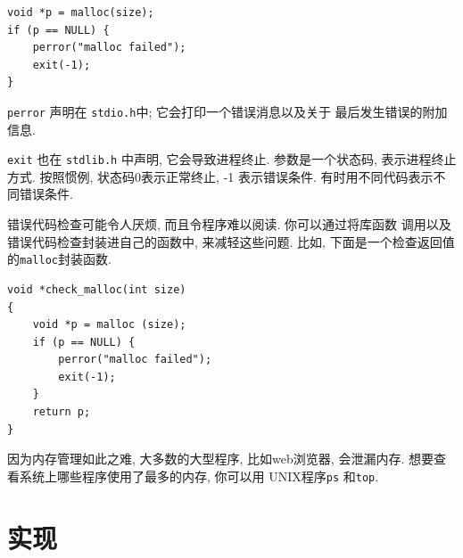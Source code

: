 \documentclass[12pt]{book}
\begin{document}
{\begin{verbatim}
void *p = malloc(size);
if (p == NULL) {
    perror("malloc failed");
    exit(-1);
}
\end{verbatim}

{\tt perror} 声明在 {\tt stdio.h}中; 它会打印一个错误消息以及关于
最后发生错误的附加信息. 

{\tt exit} 也在 {\tt stdlib.h} 中声明, 它会导致进程终止. 参数是一个状态码, 
表示进程终止方式. 按照惯例, 状态码0表示正常终止, -1 表示错误条件. 
有时用不同代码表示不同错误条件.  

错误代码检查可能令人厌烦, 而且令程序难以阅读. 你可以通过将库函数
调用以及错误代码检查封装进自己的函数中, 来减轻这些问题. 
比如, 下面是一个检查返回值的{\tt malloc}封装函数. 

\begin{verbatim}
void *check_malloc(int size)
{
    void *p = malloc (size);
    if (p == NULL) {
        perror("malloc failed");
        exit(-1);
    }
    return p;
}
\end{verbatim}

因为内存管理如此之难, 大多数的大型程序, 比如web浏览器, 会泄漏内存. 
想要查看系统上哪些程序使用了最多的内存, 你可以用
UNIX程序{\tt ps} 和{\tt top}.



\section{实现}

}
\end{document}
